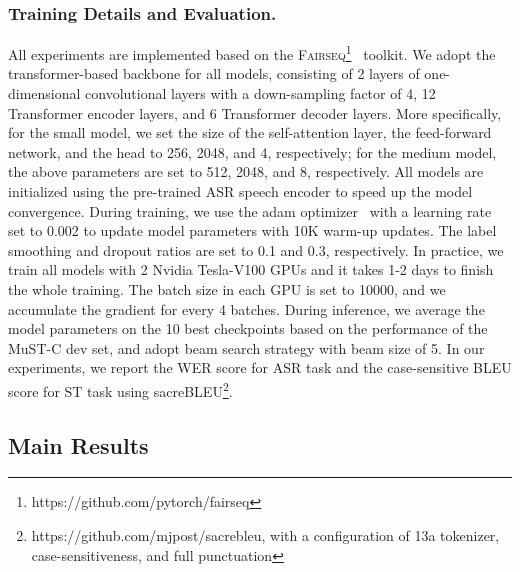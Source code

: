 \documentclass[letterpaper]{article} %
\begin{document}
\subsubsection*{Training Details and Evaluation.}
All experiments are implemented based on the \textsc{Fairseq}\footnote{https://github.com/pytorch/fairseq}~\cite{Ott2019fairseqAF} toolkit. 
We adopt the transformer-based backbone for all models, consisting of 2 layers of one-dimensional convolutional layers with a down-sampling factor of 4, 12 Transformer encoder layers, and 6 Transformer decoder layers. 
More specifically, for the small model, we set the size of the self-attention layer, the feed-forward network, and the head to 256, 2048, and 4, respectively; for the medium model, the above parameters are set to 512, 2048, and 8, respectively. 
All models are initialized using the pre-trained ASR speech encoder to speed up the model convergence.
During training, we use the adam optimizer~\cite{Kingma2015AdamAM} with a learning rate set to 0.002 to update model parameters with 10K warm-up updates.
The label smoothing and dropout ratios are set to 0.1 and 0.3, respectively. 
In practice, we train all models with 2 Nvidia Tesla-V100 GPUs and it takes 1-2 days to finish the whole training.
The batch size in each GPU is set to 10000, and we accumulate the gradient for every 4 batches. 
During inference, we average the model parameters on the 10 best checkpoints based on the performance of the MuST-C dev set, and adopt beam search strategy with beam size of 5.
In our experiments, we report the WER score for ASR task and the case-sensitive BLEU score \cite{Papineni2002BleuAM} for ST task using sacreBLEU\footnote{https://github.com/mjpost/sacrebleu, with a configuration
of 13a tokenizer, case-sensitiveness, and full punctuation}.  



\subsection{Main Results}
\end{document}
